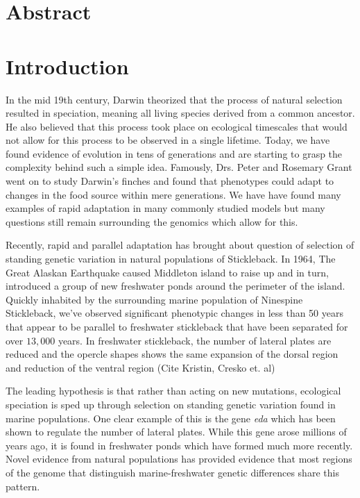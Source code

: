 \documentclass{article}
\begin{document}
\linespread{1.5}


\section{Abstract}


\section{Introduction}


In the mid 19th century,
Darwin theorized that the process of natural selection resulted in speciation, 
meaning all living species derived from a common ancestor. 
He also believed that this process took place on ecological timescales that would not allow for 
this process to be observed in a single lifetime. 
Today, we have found evidence of evolution
in tens of generations and are starting to grasp the complexity behind such a simple idea. 
Famously, Drs. Peter and Rosemary Grant went on to study Darwin's finches and
found that phenotypes could adapt to changes in the food source within mere generations.
We have have found many examples of rapid adaptation in many commonly studied models
but many questions still remain surrounding the genomics which allow for this.

Recently, rapid and parallel adaptation has brought about question of selection of
standing genetic variation in natural populations 
of Stickleback.
In 1964, The Great Alaskan Earthquake caused Middleton island to raise up and in turn, 
introduced a group of new freshwater ponds around the perimeter of the island. 
Quickly inhabited by the surrounding marine population of Ninespine Stickleback,
we've observed significant phenotypic changes in less than 50 years that appear to be 
parallel to freshwater stickleback that have been separated for over $13,000$ years. \cite{LescakE7204} 
In freshwater stickleback, 
the number of lateral plates are reduced
and the opercle shapes shows the same expansion of the dorsal region and reduction of the ventral region (Cite Kristin, Cresko et. al)

The leading hypothesis is that rather than acting on new mutations, ecological speciation is sped up through selection on standing genetic variation found in marine populations. 
One clear example of this is the gene \textit{eda} 
which has been shown to regulate the number of lateral plates. 
While this gene arose millions of years ago, 
it is found in freshwater ponds which have formed much more recently.
Novel evidence from natural populations has provided evidence that most regions of the genome that distinguish marine-freshwater genetic differences share this pattern. \cite{Nelson2017} 
\end{document}
